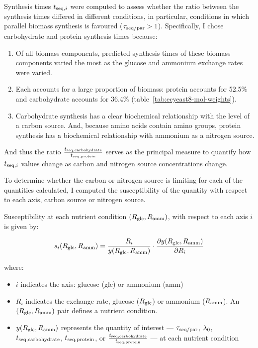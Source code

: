 Synthesis times $t_{\mathrm{seq},i}$ were computed to assess whether the ratio between the synthesis times differed in different conditions, in particular, conditions in which parallel biomass synthesis is favoured ($\tau_{\mathrm{seq}/\mathrm{par}} > 1$).
Specifically, I chose carbohydrate and protein synthesis times because:

\begin{enumerate}
  \item Of all biomass components, predicted synthesis times of these biomass components varied the most as the glucose and ammonium exchange rates were varied.
  \item Each accounts for a large proportion of biomass: protein accounts for 52.5\% and carbohydrate accounts for 36.4\% (table~\ref{tab:ecyeast8-mol-weights}).
  \item Carbohydrate synthesis has a clear biochemical relationship with the level of a carbon source.
        And, because amino acids contain amino groups, protein synthesis has a biochemical relationship with ammonium as a nitrogen source.
\end{enumerate}

And thus the ratio $\frac{t_{\mathrm{seq},\mathrm{carbohydrate}}}{t_{\mathrm{seq},\mathrm{protein}}}$ serves as the principal measure to quantify how $t_{\mathrm{seq},i}$ values change as carbon and nitrogen source concentrations change.

To determine whether the carbon or nitrogen source is limiting for each of the quantities calculated, I computed the susceptibility of the quantity with respect to each axis, carbon source or nitrogen source.

Susceptibility at each nutrient condition $(R_{\mathrm{glc}}, R_{\mathrm{amm}})$, with respect to each axis $i$ is given by:

\begin{equation}
  s_{i}(R_{\mathrm{glc}}, R_{\mathrm{amm}}) = \frac{R_{i}}{y(R_{\mathrm{glc}}, R_{\mathrm{amm}})} \cdot \frac{\partial y(R_{\mathrm{glc}}, R_{\mathrm{amm}})}{\partial R_{i}}
  \label{eq:model-susceptibility}
\end{equation}

where:
\begin{itemize}
  \item $i$ indicates the axis: glucose (glc) or ammonium (amm)
  \item $R_{i}$ indicates the exchange rate, glucose ($R_{\mathrm{glc}}$) or ammonium ($R_{\mathrm{amm}}$).
        An $(R_{\mathrm{glc}}, R_{\mathrm{amm}})$ pair defines a nutrient condition.
  \item $y(R_{\mathrm{glc}}, R_{\mathrm{amm}})$ represents the quantity of interest --- $\tau_{\mathrm{seq}/\mathrm{par}}$, $\lambda_{0}$, $t_{\mathrm{seq},\mathrm{carbohydrate}}$, $t_{\mathrm{seq},\mathrm{protein}}$, or $\frac{t_{\mathrm{seq},\mathrm{carbohydrate}}}{t_{\mathrm{seq},\mathrm{protein}}}$ --- at each nutrient condition
\end{itemize}


